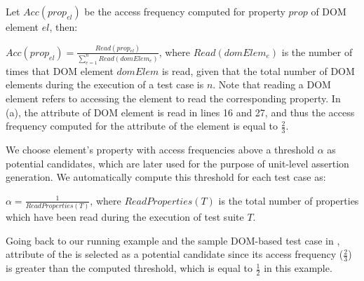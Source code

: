 Let $Acc(prop_{el})$ be the access frequency computed for property $prop$ of DOM element $el$, then:
 
$Acc(prop_{el})=\frac{Read(prop_{el})}{\sum _{e=1}^{n} Read(domElem_e)}$, where $Read(domElem_{e})$ is the number of times that DOM element $domElem$ is read, given that the total number of DOM elements during the execution of a test case is $n$.
Note that reading a DOM element refers to accessing the element to read the corresponding property. In (a), the  attribute of DOM element  is read in lines 16 and 27, and thus the access frequency
computed for the  attribute of the element is equal to $\frac{2}{3}$.

We choose element's property with access frequencies above a threshold $\alpha$ as potential candidates, which are later used for the purpose of unit-level assertion generation. We automatically compute this threshold for each test case as: 

$\alpha=\frac{1}{ReadProperties(T)}$, where $ReadProperties(T)$ is the total number of properties which have been read during the execution of test suite $T$.

Going back to our running example and the sample DOM-based test case in ,  attribute of the  is selected as a potential candidate since its access frequency ($\frac{2}{3}$) is greater than the computed threshold, which is equal to $\frac{1}{2}$ in this example.        
